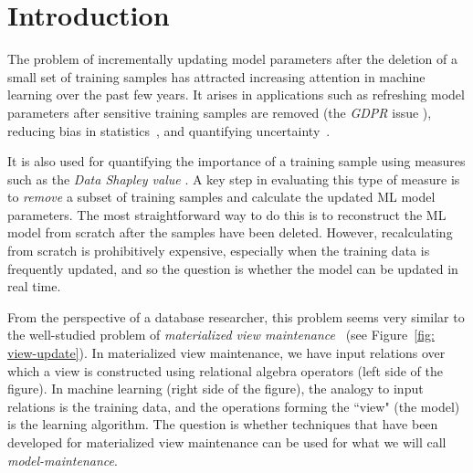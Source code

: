 \documentclass[11pt]{article}
\begin{document}

\section{Introduction}
\label{sec: intro}

The problem of incrementally updating model parameters after the deletion of a small set of training samples has attracted increasing attention in machine learning over the past few years.  It arises in applications such as refreshing model parameters after sensitive training samples are removed (the {\em GDPR} issue \cite{voigt2017eu}),
reducing bias in statistics~\cite{quenouille1956notes}, and quantifying uncertainty~\cite{politis1999subsampling}.  %

It is also used for quantifying 
 the importance of a training sample using measures such as the {\em Data Shapley value} \cite{ghorbani2019data}. 
A key step in evaluating this type of measure is to {\em remove} a subset of training samples and calculate the updated ML model parameters. The most straightforward way to do this is to reconstruct the ML model from scratch after the samples have been deleted. However, recalculating from scratch is prohibitively expensive, especially when the training data is frequently updated, and so the question is whether the model can be updated in real time.

From the perspective of a database researcher, this problem seems very similar to the well-studied problem of {\em materialized view maintenance}~\cite{DBLP:journals/debu/GuptaM95,lab2009} (see  Figure~\ref{fig: view-update}).    
In materialized view maintenance, we have input relations over which a view is constructed using relational algebra operators (left side of the figure).  In machine learning (right side of the figure), the analogy to input relations is the training data, and the operations forming the ``view" (the model) is the learning algorithm.  The question is whether techniques that have been developed for materialized view maintenance can be used for what we will call {\em model-maintenance}.  
\end{document}
